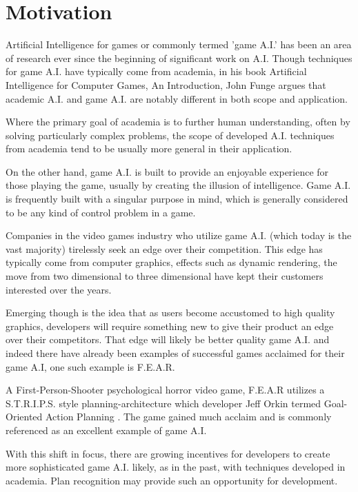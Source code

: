 \documentclass[parskip]{cs4rep}
\begin{document}
\section{Motivation}

Artificial Intelligence for games or commonly termed 'game A.I.' has been an area of research ever since the beginning of significant work on A.I. Though techniques for game A.I. have typically come from academia, in his book Artificial Intelligence for Computer Games, An Introduction, John Funge argues \cite{JohnFunge:AIForComp} that academic A.I. and game A.I. are notably different in both scope and application.

Where the primary goal of academia is to further human understanding, often by solving particularly complex problems, the scope of developed A.I. techniques from academia tend to be usually more general in their application.

On the other hand, game A.I. is built to provide an enjoyable experience for those playing the game, usually by creating the illusion of intelligence. Game A.I. is frequently built with a singular purpose in mind, which is generally considered to be any kind of control problem in a game.

Companies in the video games industry who utilize game A.I. (which today is the vast majority) tirelessly seek an edge over their competition. This edge has typically come from computer graphics, effects such as dynamic rendering, the move from two dimensional to three dimensional have kept their customers interested over the years. 

Emerging though is the idea that as users become accustomed to high quality graphics, developers will require something new to give their product an edge over their competitors. That edge will likely be better quality game A.I. and indeed there have already been examples of successful games acclaimed for their game A.I, one such example is F.E.A.R. 

A First-Person-Shooter psychological horror video game, F.E.A.R utilizes a S.T.R.I.P.S. style planning-architecture which developer Jeff Orkin termed Goal-Oriented Action Planning \cite{citeulike:5386647}. The game gained much acclaim and is commonly referenced as an excellent example of game A.I.

With this shift in focus, there are growing incentives for developers to create more sophisticated game A.I. likely, as in the past, with techniques developed in academia. Plan recognition may provide such an opportunity for development. 
\end{document}
